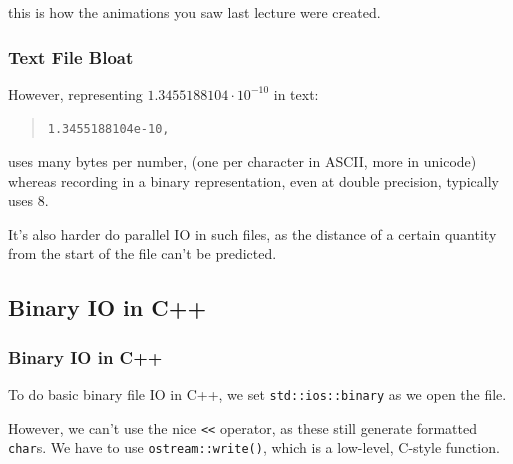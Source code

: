 \begin{Shaded}
\begin{Highlighting}[]

                \NormalTok{)[:,:-}\NormalTok{]}
\end{Highlighting}
\end{Shaded}

\begin{Shaded}
\begin{Highlighting}[]

\end{Highlighting}
\end{Shaded}

this is how the animations you saw last lecture were created.

\subsubsection{Text File Bloat}\label{text-file-bloat}

However, representing $1.3455188104 \cdot 10^{-10}$ in text:

\begin{quote}
\texttt{1.3455188104e-10,}
\end{quote}

uses many bytes per number, (one per character in ASCII, more in
unicode) whereas recording in a binary representation, even at double
precision, typically uses 8.

It's also harder do parallel IO in such files, as the distance of a
certain quantity from the start of the file can't be predicted.

\subsection{Binary IO in C++}\label{binary-io-in-c}

\subsubsection{Binary IO in C++}\label{binary-io-in-c-1}

To do basic binary file IO in C++, we set \texttt{std::ios::binary} as
we open the file.

However, we can't use the nice \texttt{\textless{}\textless{}} operator,
as these still generate formatted \texttt{char}s. We have to use
\texttt{ostream::write()}, which is a low-level, C-style function.

